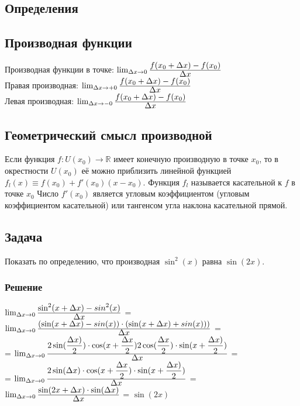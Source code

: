 
\subsection*{Определения}
\subsection*{Производная функции}
	Производная функции в точке:
	$\lim _{{\Delta x\to 0}}{\frac{\displaystyle f(x_{0}+\Delta x)-f(x_{0})}{\displaystyle \Delta x}}$\\
	Правая производная:
	$\lim _{{\Delta x\to +0}}{\frac{\displaystyle f(x_{0}+\Delta x)-f(x_{0})}{\displaystyle \Delta x}}$\\
	Левая производная:
	$\lim _{{\Delta x\to -0}}{\frac{\displaystyle f(x_{0}+\Delta x)-f(x_{0})}{\displaystyle \Delta x}}$
\subsection*{Геометрический смысл производной}
	Если функция ${f\colon U(x_{0})\to \mathbb {R} }$
	  имеет конечную производную в точке $x_0$, то в окрестности
		 $U(x_{0})$ её можно приблизить линейной функцией
${f_{l}(x)\equiv f(x_{0})+f'(x_{0})(x-x_{0})}$.
Функция ${f_{l}}$ называется касательной к $f$
в точке $x_{0}$ Число ${f'(x_{0})}$
 является угловым коэффициентом (угловым коэффициентом касательной) или тангенсом угла наклона касательной прямой.
 \subsection*{Задача}
 Показать по определению, что производная $\sin^{2}(x)$ равна $\sin(2x)$.
 \subsubsection*{Решение}
 $\lim _{{\Delta x\to 0}}{\frac{\displaystyle \sin^2(x+\Delta x)-sin^2(x)}{\displaystyle \Delta x}}$ =
 $\lim _{{\Delta x\to 0}}{\frac{\displaystyle (\sin(x+\Delta x)-sin(x))\cdot
 (\sin(x+\Delta x)+sin(x)))}{\displaystyle \Delta x}}$ =\\=
 $\lim _{{\Delta x\to 0}}{\frac{\displaystyle 2\sin(\frac{\Delta x)}{2})\cdot\cos(x+\frac{\Delta x}{2})
 2\cos(\frac{\Delta x}{2}) \cdot\sin(x+\frac{\Delta x)}{2})
 }{\displaystyle \Delta x}}$ =\\= $\lim _{{\Delta x\to 0}}{\frac{\displaystyle 2\sin(\Delta x)\cdot\cos(x+\frac{\Delta x}{2})
 \cdot\sin(x+\frac{\Delta x)}{2})
 }{\displaystyle \Delta x}}$ = $\lim _{{\Delta x\to 0}}{\frac{\displaystyle \sin(2x+\Delta x)\cdot\sin(\Delta x)}{\displaystyle \Delta x}}$
 = $\sin(2x)$


